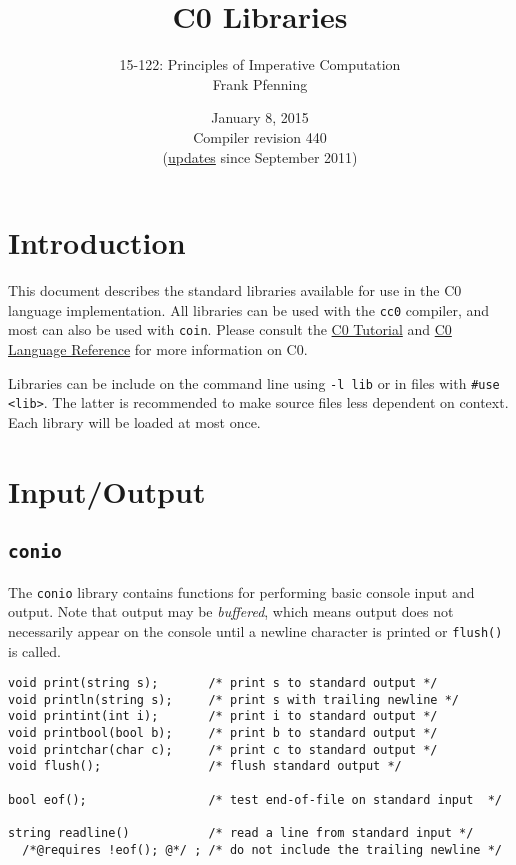\documentclass[11pt]{article}
\title{C0 Libraries}
\author{15-122: Principles of Imperative Computation \\ Frank Pfenning}
\date{January 8, 2015\\Compiler revision 440\\
  (\hyperlink{sec:updates}{updates} since September 2011)}
\begin{document}
\maketitle

\section{Introduction}

This document describes the standard libraries available for use
in the C0 language implementation.  All libraries can be used
with the \verb'cc0' compiler, and most can also be used with
\verb'coin'.   Please consult the
\href{http://c0.typesafety.net/tutorial}{C0 Tutorial} and
\href{http://c0.typesafety.net/doc/c0-reference.pdf}{C0 Language
Reference} for more information on C0.

Libraries can be include on the command line using \verb'-l lib' or in
files with \verb'#use <lib>'.  The latter is recommended to make
source files less dependent on context.  Each library will be loaded
at most once.

\section{Input/Output}

\subsection{\tt conio}

The \verb'conio' library contains functions for performing basic
console input and output.  Note that output may be \emph{buffered},
which means output does not necessarily appear on the console
until a newline character is printed or \verb'flush()' is called.

\begin{small}
\begin{verbatim}
void print(string s);       /* print s to standard output */
void println(string s);     /* print s with trailing newline */
void printint(int i);       /* print i to standard output */
void printbool(bool b);     /* print b to standard output */
void printchar(char c);     /* print c to standard output */
void flush();               /* flush standard output */

bool eof();                 /* test end-of-file on standard input  */

string readline()           /* read a line from standard input */
  /*@requires !eof(); @*/ ; /* do not include the trailing newline */
\end{verbatim}
\end{small}
\end{document}
